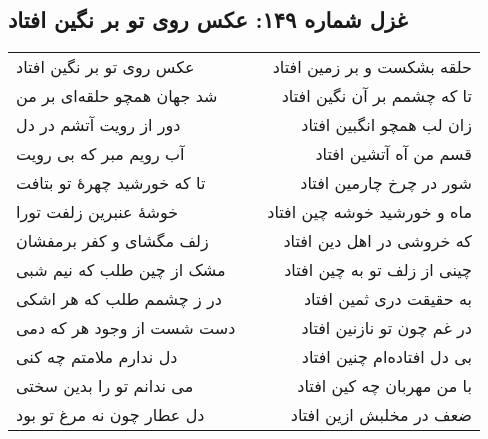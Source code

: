 \begin{center}
\section*{غزل شماره ۱۴۹: عکس روی تو بر نگین افتاد}
\label{sec:149}
\begin{longtable}{l p{0.5cm} r}
عکس روی تو بر نگین افتاد
&&
حلقه بشکست و بر زمین افتاد
\\
شد جهان همچو حلقه‌ای بر من
&&
تا که چشمم بر آن نگین افتاد
\\
دور از رویت آتشم در دل
&&
زان لب همچو انگبین افتاد
\\
آب رویم مبر که بی رویت
&&
قسم من آه آتشین افتاد
\\
تا که خورشید چهرهٔ تو بتافت
&&
شور در چرخ چارمین افتاد
\\
خوشهٔ عنبرین زلفت تورا
&&
ماه و خورشید خوشه چین افتاد
\\
زلف مگشای و کفر برمفشان
&&
که خروشی در اهل دین افتاد
\\
مشک از چین طلب که نیم شبی
&&
چینی از زلف تو به چین افتاد
\\
در ز چشمم طلب که هر اشکی
&&
به حقیقت دری ثمین افتاد
\\
دست شست از وجود هر که دمی
&&
در غم چون تو نازنین افتاد
\\
دل ندارم ملامتم چه کنی
&&
بی دل افتاده‌ام چنین افتاد
\\
می ندانم تو را بدین سختی
&&
با من مهربان چه کین افتاد
\\
دل عطار چون نه مرغ تو بود
&&
ضعف در مخلبش ازین افتاد
\\
\end{longtable}
\end{center}
